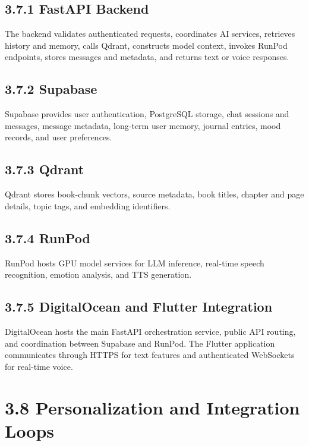\documentclass[
  letterpaper,
  12pt,
  a4paper,
  openany]{report}
\begin{document}
\subsection{3.7.1 FastAPI Backend}\label{fastapi-backend}

The backend validates authenticated requests, coordinates AI services,
retrieves history and memory, calls Qdrant, constructs model context,
invokes RunPod endpoints, stores messages and metadata, and returns text
or voice responses.

\subsection{3.7.2 Supabase}\label{supabase}

Supabase provides user authentication, PostgreSQL storage, chat sessions
and messages, message metadata, long-term user memory, journal entries,
mood records, and user preferences.

\subsection{3.7.3 Qdrant}\label{qdrant}

Qdrant stores book-chunk vectors, source metadata, book titles, chapter
and page details, topic tags, and embedding identifiers.

\subsection{3.7.4 RunPod}\label{runpod}

RunPod hosts GPU model services for LLM inference, real-time speech
recognition, emotion analysis, and TTS generation.

\subsection{3.7.5 DigitalOcean and Flutter
Integration}\label{digitalocean-and-flutter-integration}

DigitalOcean hosts the main FastAPI orchestration service, public API
routing, and coordination between Supabase and RunPod. The Flutter
application communicates through HTTPS for text features and
authenticated WebSockets for real-time voice.

\section{3.8 Personalization and Integration
Loops}\label{personalization-and-integration-loops}
\end{document}

